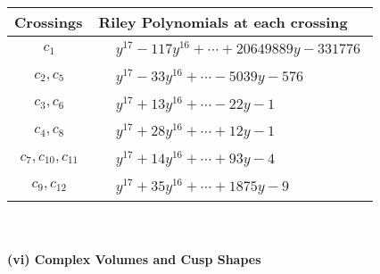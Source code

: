 \documentclass[1p]{elsarticle_modified}
\theoremstyle{definition}
\begin{document}
\begin{tabular}{m{50pt}|m{274pt}}
Crossings & \hspace{64pt}Riley Polynomials at each crossing \\
\hline $$\begin{aligned}c_{1}\end{aligned}$$&$\begin{aligned}
&y^{17}-117 y^{16}+\cdots+20649889 y-331776
\end{aligned}$\\
\hline $$\begin{aligned}c_{2},c_{5}\end{aligned}$$&$\begin{aligned}
&y^{17}-33 y^{16}+\cdots-5039 y-576
\end{aligned}$\\
\hline $$\begin{aligned}c_{3},c_{6}\end{aligned}$$&$\begin{aligned}
&y^{17}+13 y^{16}+\cdots-22 y-1
\end{aligned}$\\
\hline $$\begin{aligned}c_{4},c_{8}\end{aligned}$$&$\begin{aligned}
&y^{17}+28 y^{16}+\cdots+12 y-1
\end{aligned}$\\
\hline $$\begin{aligned}c_{7},c_{10},c_{11}\end{aligned}$$&$\begin{aligned}
&y^{17}+14 y^{16}+\cdots+93 y-4
\end{aligned}$\\
\hline $$\begin{aligned}c_{9},c_{12}\end{aligned}$$&$\begin{aligned}
&y^{17}+35 y^{16}+\cdots+1875 y-9
\end{aligned}$\\
\hline
\end{tabular}\\~\\
\newpage\flushleft \textbf{(vi) Complex Volumes and Cusp Shapes}
\end{document}
